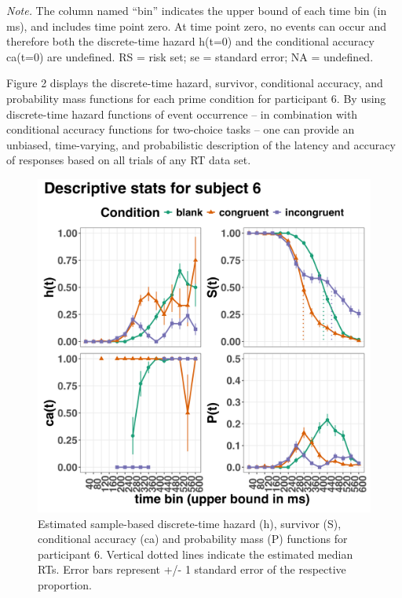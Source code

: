 \documentclass[
  man, donotrepeattitle,floatsintext]{apa6}
\begin{document}
\begin{table}[H]
\begin{center}
\begin{threeparttable}
\begin{tablenotes}[para]
\normalsize{\textit{Note.} The column named ``bin'' indicates the upper bound of each time bin (in ms), and includes time point zero. At time point zero, no events can occur and therefore both the discrete-time hazard h(t=0) and the conditional accuracy ca(t=0) are undefined. RS = risk set; se = standard error; NA = undefined.}
\end{tablenotes}

\end{threeparttable}
\end{center}

\end{table}

Figure 2 displays the discrete-time hazard, survivor, conditional accuracy, and probability mass functions for each prime condition for participant 6. By using discrete-time hazard functions of event occurrence -- in combination with conditional accuracy functions for two-choice tasks -- one can provide an unbiased, time-varying, and probabilistic description of the latency and accuracy of responses based on all trials of any RT data set.



\begin{figure}[H]

{\centering \includegraphics[width=0.9\linewidth,height=0.67\textheight,]{../Tutorial_1_descriptive_stats/figures/Plot_for_subject6_PanisSchmidt} 

}

\caption{Estimated sample-based discrete-time hazard (h), survivor (S), conditional accuracy (ca) and probability mass (P) functions for participant 6. Vertical dotted lines indicate the estimated median RTs. Error bars represent +/- 1 standard error of the respective proportion.}\label{fig:eha-plot}
\end{figure}
\end{document}
